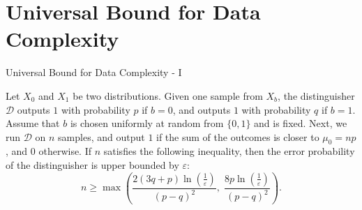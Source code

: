 \section*{Universal Bound for Data Complexity}

\begin{frame}{Universal Bound for Data Complexity - I}
\begin{theorem}
\small
Let $X_0$ and $X_1$ be two distributions.  
Given one sample from $X_b$, the distinguisher $\mathcal{D}$ outputs $1$ with probability $p$ if $b = 0$, and outputs $1$ with probability $q$ if $b = 1$.  
Assume that $b$ is chosen uniformly at random from $\{0, 1\}$ and is fixed.  
Next, we run $\mathcal{D}$ on $n$ samples, and output $1$ if the sum of the outcomes is closer to $\mu_0 = np$, and $0$ otherwise.  
If $n$ satisfies the following inequality, then the error probability of the distinguisher is upper bounded by $\varepsilon$:  
\begin{equation*}
n \geq \max\left(\frac{2(3q + p)\ln\left(\frac{1}{\varepsilon}\right)}{(p - q)^2}, \; \frac{8p \ln\left(\frac{1}{\varepsilon}\right)}{(p - q)^2}\right).
\end{equation*}
\end{theorem}
\end{frame}

